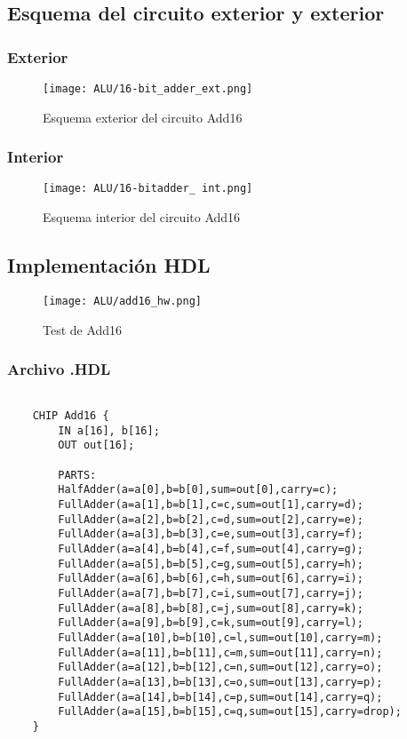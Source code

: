 \documentclass[12pt]{article}
\begin{document}
\subsection{Esquema del circuito exterior y exterior}
\subsubsection{Exterior}
\begin{figure}[H]
	\centering
	\texttt{[image: ALU/16-bit\_adder\_ext.png]}
	\caption{Esquema exterior del circuito Add16}
	\label{fig:add16}
\end{figure}
\subsubsection{Interior}
\begin{figure}[H]
	\centering
	\texttt{[image: ALU/16-bitadder\_ int.png]}
	\caption{Esquema interior del circuito Add16}
	\label{fig:f_add16}
\end{figure}
\subsection{Implementación HDL}
\begin{figure}[H]
	\centering
	\texttt{[image: ALU/add16\_hw.png]}
	\caption{Test de Add16}
	\label{fig:enter-label}
\end{figure}
\newpage
\subsubsection{Archivo .HDL}
\begin{lstlisting}

	CHIP Add16 {
		IN a[16], b[16];
		OUT out[16];

		PARTS:
		HalfAdder(a=a[0],b=b[0],sum=out[0],carry=c);
		FullAdder(a=a[1],b=b[1],c=c,sum=out[1],carry=d);
		FullAdder(a=a[2],b=b[2],c=d,sum=out[2],carry=e);
		FullAdder(a=a[3],b=b[3],c=e,sum=out[3],carry=f);
		FullAdder(a=a[4],b=b[4],c=f,sum=out[4],carry=g);
		FullAdder(a=a[5],b=b[5],c=g,sum=out[5],carry=h);
		FullAdder(a=a[6],b=b[6],c=h,sum=out[6],carry=i);
		FullAdder(a=a[7],b=b[7],c=i,sum=out[7],carry=j);
		FullAdder(a=a[8],b=b[8],c=j,sum=out[8],carry=k);
		FullAdder(a=a[9],b=b[9],c=k,sum=out[9],carry=l);
		FullAdder(a=a[10],b=b[10],c=l,sum=out[10],carry=m);
		FullAdder(a=a[11],b=b[11],c=m,sum=out[11],carry=n);
		FullAdder(a=a[12],b=b[12],c=n,sum=out[12],carry=o);
		FullAdder(a=a[13],b=b[13],c=o,sum=out[13],carry=p);
		FullAdder(a=a[14],b=b[14],c=p,sum=out[14],carry=q);
		FullAdder(a=a[15],b=b[15],c=q,sum=out[15],carry=drop);
	}
\end{lstlisting}
\end{document}
